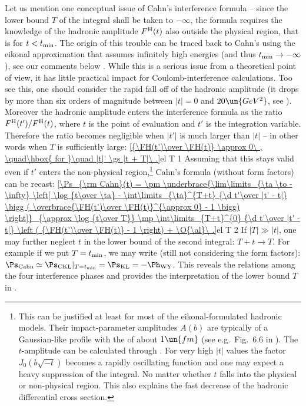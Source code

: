 Let us mention one conceptual issue of Cahn's interference formula  -- since the lower bound $T$ of the integral shall be taken to $-\infty$, the formula requires the knowledge of the hadronic amplitude $F^{\rm H}(t)$ also outside the physical region, that is for $t < t_{\rm min}$. The origin of this trouble can be traced back to Cahn's using the eikonal approximation that assumes infinitely high energies (and thus $t_{\rm min} \to -\infty$), see our comments below . While this is a serious issue from a theoretical point of view,  it has little practical impact for Coulomb-interference calculations. Too see this, one should consider the rapid fall off of the hadronic amplitude (it drops by more than six orders of magnitude between $|t|=0$ and $20\un{GeV^2}$, see ). Moreover the hadronic amplitude enters the interference formula  as the ratio $F^{\rm H}(t') / F^{\rm H}(t)$, where $t$ is the point of evaluation and $t'$ is the integration variable. Therefore the ratio becomes negligible when $|t'|$ is much larger than $|t|$ -- in other words when $T$ is sufficiently large:
\eqref{{\FH(t')\over \FH(t)} \approx 0\ , \quad\hbox{ for }\quad |t|' \gs |t + T|\ .}{el T 1}
Assuming that this stays valid even if $t'$ enters the non-physical region,\footnote{%
This can be justified at least for most of the eikonal-formulated hadronic models. Their impact-parameter amplitudes $A(b)$ are typically of a Gaussian-like profile with the  of about $1\un{fm}$ (see e.g.~Fig.~6.6 in ). The $t$-amplitude can be calculated through . For very high $|t|$ values the factor $J_0(b\sqrt{-t})$ becomes a rapidly oscillating function and one may expect a heavy suppression of the integral. No matter whether $t$ falls into the physical or non-physical region. This also explains the fast decrease of the hadronic differential cross section. 
} Cahn's formula  (without form factors) can be recast:
\eqref{\Ps_{\rm Cahn}(t) =
\pm \underbrace{\lim\limits_{\ta \to -\infty} \left[
	\log {t\over \ta}
	- \int\limits_{\ta}^{T+t} {\d t'\over |t' - t|} \bigg ( \overbrace{\FH(t')\over \FH(t)}^{\approx 0} - 1 \bigg)
\right]}_{\approx \log {t\over T}}
\mp \int\limits_{T+t}^{0} {\d t'\over |t' - t|} \left ( {\FH(t')\over \FH(t)} - 1 \right)
+ \O{\al}\ .}{el T 2}
If $|T| \gg |t|$, one may further neglect $t$ in the lower bound of the second integral: $T+t\rightarrow T$. For example if we put $T=t_{\rm min}$, we may write (still not considering the form factors): $\Ps_{\rm Cahn} \simeq \Ps_{\rm CKL}|_{T=t_{\rm min}} = \Ps_{\rm KL} = - \Ph_{\rm WY}$. This reveals the relations among the four interference phases and provides the interpretation of the lower bound $T$ in .

